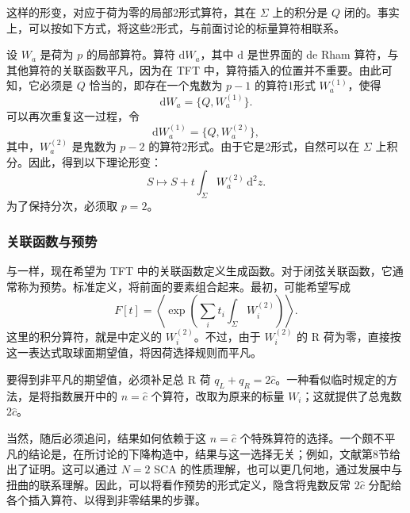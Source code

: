 这样的形变，对应于荷为零的局部2形式算符，其在 $\Sigma$ 上的积分是 $Q$ 闭的。事实上，可以按如下方式，将这些2形式，与前面讨论的标量算符相联系。

设 $W_a$ 是荷为 $p$ 的局部算符。算符 $\mathrm{d}W_a$，其中 $\mathrm{d}$ 是世界面的 de Rham 算符，与其他算符的关联函数平凡，因为在 TFT 中，算符插入的位置并不重要。由此可知，它必须是 $Q$ 恰当的，即存在一个鬼数为 $p-1$ 的算符1形式 $W_a^{(1)}$，使得
\begin{equation}\label{eq:3.111}
\mathrm{d}W_a=\{Q,W_a^{(1)}\}.
\end{equation}
可以再次重复这一过程，令
\begin{equation}\label{eq:3.112}
\mathrm{d}W_a^{(1)}=\{Q,W_a^{(2)}\},
\end{equation}
其中，$W_a^{(2)}$ 是鬼数为 $p-2$ 的算符2形式。由于它是2形式，自然可以在 $\Sigma$ 上积分。因此，得到以下理论形变：
\begin{equation}\label{eq:3.113}
S\longmapsto S+t\int_\Sigma W_a^{(2)}\,\mathrm{d}^2z.
\end{equation}
为了保持分次，必须取 $p=2$。

\subsubsection{关联函数与预势}\label{sec:3.3.5.3}

与一样，现在希望为 TFT 中的关联函数定义生成函数。对于闭弦关联函数，它通常称为预势。标准定义，将前面的要素组合起来。最初，可能希望写成
\begin{equation}\label{eq:3.114}
F[t]=\left\langle
\exp\left(\sum_i t_i\int_\Sigma W_i^{(2)}\right)
\right\rangle.
\end{equation}
这里的积分算符，就是中定义的 $W_i^{(2)}$。不过，由于 $W_i^{(2)}$ 的 R 荷为零，直接按这一表达式取球面期望值，将因荷选择规则而平凡。

要得到非平凡的期望值，必须补足总 R 荷 $q_L+q_R=2\widehat c$。一种看似临时规定的方法，是将指数展开中的 $n=\widehat c$ 个算符，改取为原来的标量 $W_i$；这就提供了总鬼数 $2\widehat c$。

当然，随后必须追问，结果如何依赖于这 $n=\widehat c$ 个特殊算符的选择。一个颇不平凡的结论是，在所讨论的下降构造中，结果与这一选择无关；例如，文献第8节给出了证明。这可以通过 $N=2$ SCA 的性质理解，也可以更几何地，通过发展中与扭曲的联系理解。因此，可以将看作预势的形式定义，隐含将鬼数反常 $2\widehat c$ 分配给各个插入算符、以得到非零结果的步骤。

